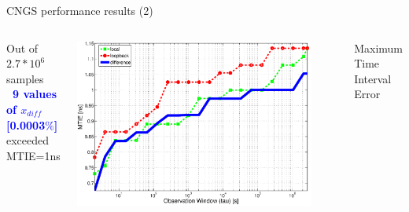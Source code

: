 \documentclass[compress,red]{beamer}
\begin{document}
\begin{frame}{CNGS performance results (2)}

  \begin{columns}[c]
	\begin{center}

	    Out of $2.7*10^6$ samples\\
			\textbf{\textcolor{blue}{~9 values of $x_{diff}$ [0.0003$\%$]}} \\
                       exceeded MTIE=1ns
		
% 
	\end{center}
		\vspace{0.08cm}
		\begin{center}
		\includegraphics[width=0.9\textwidth]{measurements/MTIE2.pdf}
		\end{center}
		\begin{center}
		Maximum Time Interval Error
		\end{center}
  \end{columns}
  \begin{columns}[c]


\end{columns}
\end{frame}
\end{document}
